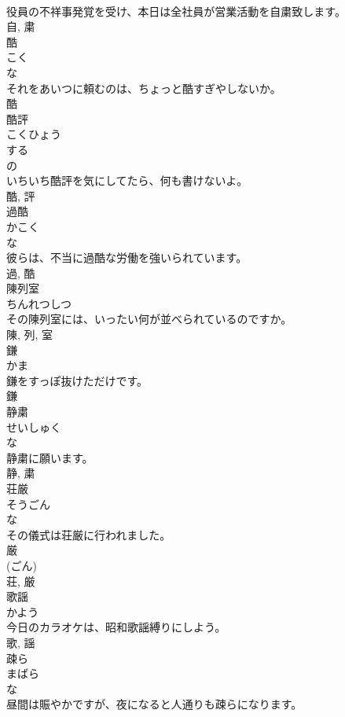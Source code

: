 \documentclass[8pt]{extreport}
\begin{document}
\begin{CJK}{UTF8}{min}
\\	役員の不祥事発覚を受け、本日は全社員が営業活動を自粛致します。	
\\	自, 粛	
\\	酷	
\\	こく	
\\	な 
\\	それをあいつに頼むのは、ちょっと酷すぎやしないか。	
\\	酷	
\\	酷評	
\\	こくひょう	
\\	する 
\\	の 
\\	いちいち酷評を気にしてたら、何も書けないよ。	
\\	酷, 評	
\\	過酷	
\\	かこく	
\\	な 
\\	彼らは、不当に過酷な労働を強いられています。	
\\	過, 酷	
\\	陳列室	
\\	ちんれつしつ	
\\	その陳列室には、いったい何が並べられているのですか。	
\\	陳, 列, 室	
\\	鎌	
\\	かま	
\\	鎌をすっぽ抜けただけです。	
\\	鎌	
\\	静粛	
\\	せいしゅく	
\\	な 
\\	静粛に願います。	
\\	静, 粛	
\\	荘厳	
\\	そうごん	
\\	な 
\\	その儀式は荘厳に行われました。	
\\	厳 
\\	(ごん) 
\\	荘, 厳	
\\	歌謡	
\\	かよう	
\\	今日のカラオケは、昭和歌謡縛りにしよう。	
\\	歌, 謡	
\\	疎ら	
\\	まばら	
\\	な 
\\	昼間は賑やかですが、夜になると人通りも疎らになります。	

\end{CJK}
\end{document}
